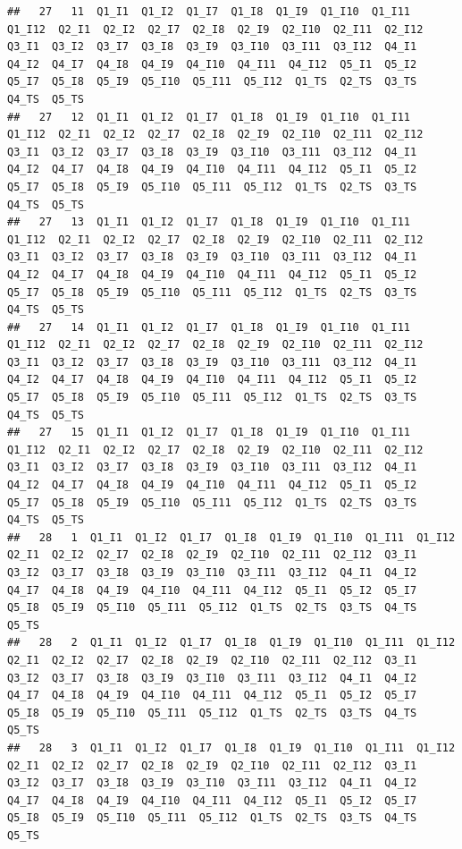 \documentclass[]{book}
\begin{document}
\begin{verbatim}
##   27   11  Q1_I1  Q1_I2  Q1_I7  Q1_I8  Q1_I9  Q1_I10  Q1_I11  Q1_I12  Q2_I1  Q2_I2  Q2_I7  Q2_I8  Q2_I9  Q2_I10  Q2_I11  Q2_I12  Q3_I1  Q3_I2  Q3_I7  Q3_I8  Q3_I9  Q3_I10  Q3_I11  Q3_I12  Q4_I1  Q4_I2  Q4_I7  Q4_I8  Q4_I9  Q4_I10  Q4_I11  Q4_I12  Q5_I1  Q5_I2  Q5_I7  Q5_I8  Q5_I9  Q5_I10  Q5_I11  Q5_I12  Q1_TS  Q2_TS  Q3_TS  Q4_TS  Q5_TS
##   27   12  Q1_I1  Q1_I2  Q1_I7  Q1_I8  Q1_I9  Q1_I10  Q1_I11  Q1_I12  Q2_I1  Q2_I2  Q2_I7  Q2_I8  Q2_I9  Q2_I10  Q2_I11  Q2_I12  Q3_I1  Q3_I2  Q3_I7  Q3_I8  Q3_I9  Q3_I10  Q3_I11  Q3_I12  Q4_I1  Q4_I2  Q4_I7  Q4_I8  Q4_I9  Q4_I10  Q4_I11  Q4_I12  Q5_I1  Q5_I2  Q5_I7  Q5_I8  Q5_I9  Q5_I10  Q5_I11  Q5_I12  Q1_TS  Q2_TS  Q3_TS  Q4_TS  Q5_TS
##   27   13  Q1_I1  Q1_I2  Q1_I7  Q1_I8  Q1_I9  Q1_I10  Q1_I11  Q1_I12  Q2_I1  Q2_I2  Q2_I7  Q2_I8  Q2_I9  Q2_I10  Q2_I11  Q2_I12  Q3_I1  Q3_I2  Q3_I7  Q3_I8  Q3_I9  Q3_I10  Q3_I11  Q3_I12  Q4_I1  Q4_I2  Q4_I7  Q4_I8  Q4_I9  Q4_I10  Q4_I11  Q4_I12  Q5_I1  Q5_I2  Q5_I7  Q5_I8  Q5_I9  Q5_I10  Q5_I11  Q5_I12  Q1_TS  Q2_TS  Q3_TS  Q4_TS  Q5_TS
##   27   14  Q1_I1  Q1_I2  Q1_I7  Q1_I8  Q1_I9  Q1_I10  Q1_I11  Q1_I12  Q2_I1  Q2_I2  Q2_I7  Q2_I8  Q2_I9  Q2_I10  Q2_I11  Q2_I12  Q3_I1  Q3_I2  Q3_I7  Q3_I8  Q3_I9  Q3_I10  Q3_I11  Q3_I12  Q4_I1  Q4_I2  Q4_I7  Q4_I8  Q4_I9  Q4_I10  Q4_I11  Q4_I12  Q5_I1  Q5_I2  Q5_I7  Q5_I8  Q5_I9  Q5_I10  Q5_I11  Q5_I12  Q1_TS  Q2_TS  Q3_TS  Q4_TS  Q5_TS
##   27   15  Q1_I1  Q1_I2  Q1_I7  Q1_I8  Q1_I9  Q1_I10  Q1_I11  Q1_I12  Q2_I1  Q2_I2  Q2_I7  Q2_I8  Q2_I9  Q2_I10  Q2_I11  Q2_I12  Q3_I1  Q3_I2  Q3_I7  Q3_I8  Q3_I9  Q3_I10  Q3_I11  Q3_I12  Q4_I1  Q4_I2  Q4_I7  Q4_I8  Q4_I9  Q4_I10  Q4_I11  Q4_I12  Q5_I1  Q5_I2  Q5_I7  Q5_I8  Q5_I9  Q5_I10  Q5_I11  Q5_I12  Q1_TS  Q2_TS  Q3_TS  Q4_TS  Q5_TS
##   28   1  Q1_I1  Q1_I2  Q1_I7  Q1_I8  Q1_I9  Q1_I10  Q1_I11  Q1_I12  Q2_I1  Q2_I2  Q2_I7  Q2_I8  Q2_I9  Q2_I10  Q2_I11  Q2_I12  Q3_I1  Q3_I2  Q3_I7  Q3_I8  Q3_I9  Q3_I10  Q3_I11  Q3_I12  Q4_I1  Q4_I2  Q4_I7  Q4_I8  Q4_I9  Q4_I10  Q4_I11  Q4_I12  Q5_I1  Q5_I2  Q5_I7  Q5_I8  Q5_I9  Q5_I10  Q5_I11  Q5_I12  Q1_TS  Q2_TS  Q3_TS  Q4_TS  Q5_TS
##   28   2  Q1_I1  Q1_I2  Q1_I7  Q1_I8  Q1_I9  Q1_I10  Q1_I11  Q1_I12  Q2_I1  Q2_I2  Q2_I7  Q2_I8  Q2_I9  Q2_I10  Q2_I11  Q2_I12  Q3_I1  Q3_I2  Q3_I7  Q3_I8  Q3_I9  Q3_I10  Q3_I11  Q3_I12  Q4_I1  Q4_I2  Q4_I7  Q4_I8  Q4_I9  Q4_I10  Q4_I11  Q4_I12  Q5_I1  Q5_I2  Q5_I7  Q5_I8  Q5_I9  Q5_I10  Q5_I11  Q5_I12  Q1_TS  Q2_TS  Q3_TS  Q4_TS  Q5_TS
##   28   3  Q1_I1  Q1_I2  Q1_I7  Q1_I8  Q1_I9  Q1_I10  Q1_I11  Q1_I12  Q2_I1  Q2_I2  Q2_I7  Q2_I8  Q2_I9  Q2_I10  Q2_I11  Q2_I12  Q3_I1  Q3_I2  Q3_I7  Q3_I8  Q3_I9  Q3_I10  Q3_I11  Q3_I12  Q4_I1  Q4_I2  Q4_I7  Q4_I8  Q4_I9  Q4_I10  Q4_I11  Q4_I12  Q5_I1  Q5_I2  Q5_I7  Q5_I8  Q5_I9  Q5_I10  Q5_I11  Q5_I12  Q1_TS  Q2_TS  Q3_TS  Q4_TS  Q5_TS

\end{verbatim}
\end{document}

